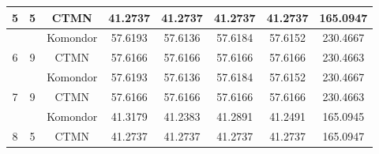 \documentclass[a4paper]{article}
\begin{document}
\begin{table}[]
\begin{tabular}{|c|c|c|c|c|c|c|c|}
\multirow{-2}{*}{5}                         & \multirow{-2}{*}{5}                          & CTMN          & 41.2737    & 41.2737    & 41.2737    & 41.2737    & 165.0947   \\ \hline
                                            &                                              & Komondor       & 57.6193    & 57.6136    & 57.6184    & 57.6152    & 230.4667   \\ \cline{3-8} 
\multirow{-2}{*}{6}                         & \multirow{-2}{*}{9}                          & CTMN          & 57.6166    & 57.6166    & 57.6166    & 57.6166    & 230.4663   \\ \hline
                                            &                                              & Komondor       & 57.6193    & 57.6136    & 57.6184    & 57.6152    & 230.4667   \\ \cline{3-8} 
\multirow{-2}{*}{7}                         & \multirow{-2}{*}{9}                          & CTMN          & 57.6166    & 57.6166    & 57.6166    & 57.6166    & 230.4663   \\ \hline
                                            &                                              & Komondor       & 41.3179    & 41.2383    & 41.2891    & 41.2491    & 165.0945   \\ \cline{3-8} 
\multirow{-2}{*}{8}                         & \multirow{-2}{*}{5}                          & CTMN          & 41.2737    & 41.2737    & 41.2737    & 41.2737    & 165.0947   \\ \hline
\end{tabular}
\end{table}
\end{document}
